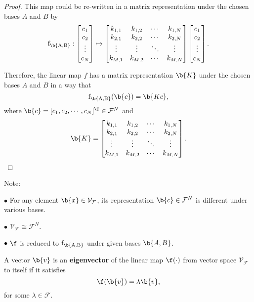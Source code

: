 \begin{proof}
This map could be re-written in a matrix representation under the chosen bases $A$ and $B$ by
$$\operatorname{f_{\b{A,B}}}:
\begin{bmatrix}
c_1 \\
c_2 \\
\vdots \\
c_N
\end{bmatrix}
\mapsto 
\begin{bmatrix}
k_{1,1} &k_{1,2} &\cdots &k_{1,N} \\
k_{2,1} &k_{2,2} &\cdots &k_{2,N} \\
\vdots  &\vdots  &\ddots &\vdots  \\
k_{M,1} &k_{M,2} &\cdots &k_{M,N} 
\end{bmatrix}
\begin{bmatrix}
c_1 \\
c_2 \\
\vdots \\
c_N
\end{bmatrix}.
$$


Therefore, the linear map $f$ has a matrix representation $\b{K}$ under the chosen bases $A$ and $B$ in a way that $$\operatorname{f_{\b{A,B}}}(\b{c}) = \b{Kc},$$
where $\b{c} = [c_1, c_2, \cdots, c_N]^\T \in \mathcal{F}^N$ and
$$ \b{K} =
\begin{bmatrix}
k_{1,1} &k_{1,2} &\cdots &k_{1,N} \\
k_{2,1} &k_{2,2} &\cdots &k_{2,N} \\
\vdots  &\vdots  &\ddots &\vdots  \\
k_{M,1} &k_{M,2} &\cdots &k_{M,N} 
\end{bmatrix}.
$$
\end{proof}


Note: 

$\bullet$ For any element $\b{x} \in \mathcal{V}_{\mathcal{F}}$, its representation $\b{c} \in \mathcal{F}^N$ is different under various bases.

$\bullet \,\,  \mathcal{V}_{\mathcal{F}} \cong \mathcal{F}^N$.

$\bullet \,\, \f$ is reduced to $\operatorname{f_{\b{A,B}}}$ under given bases $\b{A,B}$. 



\begin{definition} 
A vector $\b{v}$ is an \textbf{eigenvector} of the linear map $\f(\cdot)$ from vector space $\mathcal{V}_{\mathcal{F}}$ to itself if it satisfies 
$$\f( \b{v} ) = \lambda \b{v},$$
for some $\lambda \in \mathcal{F}$. 
\end{definition}

